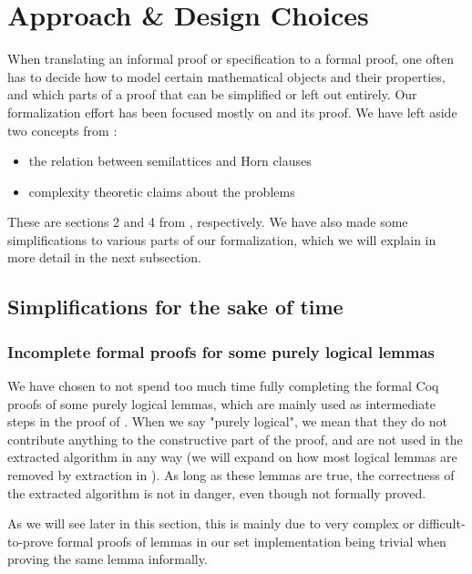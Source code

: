 \chapter{Approach \& Design Choices}
\label{ch:approach_design_choices}

When translating an informal proof or specification to a formal proof,
one often has to decide how to model certain mathematical objects and their properties,
and which parts of a proof that can be simplified or left out entirely.
Our formalization effort has been focused mostly on  and its proof.
We have left aside two concepts from \cite{mbezem}:

\begin{itemize}
    \item the relation between semilattices and Horn clauses
    \item complexity theoretic claims about the problems
\end{itemize}

These are sections 2 and 4 from \cite{mbezem}, respectively.
We have also made some simplifications to various parts of our formalization,
which we will explain in more detail in the next subsection.

\section{Simplifications for the sake of time}
\label{sec:simplifications}

\subsection{Incomplete formal proofs for some purely logical lemmas}
\label{ssec:incomplete_formal_proofs_for_some_purely_logical_lemmas}

We have chosen to not spend too much time fully completing the formal Coq proofs of some purely logical lemmas,
which are mainly used as intermediate steps in the proof of .
When we say "purely logical", we mean that they do not contribute anything to the
constructive part of the proof, and are not used in the extracted algorithm in any way
(we will expand on how most logical lemmas are removed by extraction in ).
As long as these lemmas are true, the correctness of the extracted algorithm is not in danger,
even though not formally proved.

As we will see later in this section, this is mainly due to
very complex or difficult-to-prove formal proofs of lemmas in our set implementation
being trivial when proving the same lemma informally.

